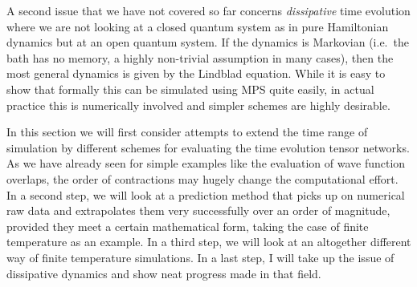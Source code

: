 A second issue that we have not covered so far concerns {\em dissipative} time evolution where we are not looking at a closed quantum system as in pure Hamiltonian dynamics but at an open quantum system. If the dynamics is Markovian (i.e.\ the bath has no memory, a highly non-trivial assumption in many cases), then the most general dynamics is given by the Lindblad equation. While it is easy to show that formally this can be simulated using MPS quite easily, in actual practice this is numerically involved and simpler schemes are highly desirable. 

In this section we will first consider attempts to extend the time range of simulation by different schemes for evaluating the time evolution tensor networks. As we have already seen for simple examples like the evaluation of wave function overlaps, the order of contractions may hugely change the computational effort. In a second step, we will look at a prediction method that picks up on numerical raw data and extrapolates them very successfully over an order of magnitude, provided they meet a certain mathematical form, taking the case of finite temperature as an example. In a third step, we will look at an altogether different way of finite temperature simulations. In a last step, I will take up the issue of dissipative dynamics and show neat progress made in that field.

